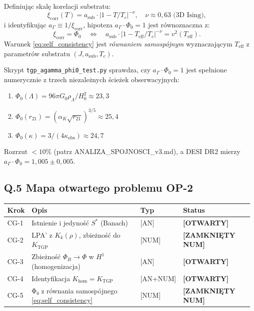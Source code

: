 \begin{propozycja}[Hipoteza $a_\Gamma \cdot \Phi_0 = 1$ jako warunek samospójności]
\label{prop:agamma_phi0}
Definiując skalę korelacji substratu:
\begin{equation}
  \xi_\mathrm{corr}(T) = a_\mathrm{sub} \cdot |1 - T/T_c|^{-\nu},
  \quad \nu \approx 0{,}63 \text{ (3D Ising)},
\end{equation}
i identyfikując $a_\Gamma \equiv 1/\xi_\mathrm{corr}$, hipoteza
$a_\Gamma \cdot \Phi_0 = 1$ jest równoznaczna z:
\begin{equation}
  \xi_\mathrm{corr} = \Phi_0
  \quad\Longleftrightarrow\quad
  a_\mathrm{sub} \cdot |1 - T_\mathrm{eff}/T_c|^{-\nu} = v^2(T_\mathrm{eff}).
  \label{eq:self_consistency}
\end{equation}
Warunek \eqref{eq:self_consistency} jest \emph{równaniem samospójnym}
wyznaczającym $T_\mathrm{eff}$ z parametrów substratu $(J, a_\mathrm{sub}, T_c)$.
\end{propozycja}

\begin{uwaga}
Skrypt \texttt{tgp\_agamma\_phi0\_test.py} sprawdza, czy $a_\Gamma \cdot \Phi_0 = 1$
jest spełnione numerycznie z trzech niezależnych ścieżek obserwacyjnych:
\begin{enumerate}
  \item $\Phi_0(\Lambda) = 96\pi G_0 \rho_\Lambda / H_0^2 \approx 23{,}3$
  \item $\Phi_0(r_{21}) = (\alpha_K \sqrt{r_{21}})^{3/5} \approx 25{,}4$
  \item $\Phi_0(\kappa) = 3/(4\kappa_\mathrm{obs}) \approx 24{,}7$
\end{enumerate}
Rozrzut $< 10\%$ (patrz ANALIZA\_SPOJNOSCI\_v3.md), a DESI DR2 mierzy
$a_\Gamma \cdot \Phi_0 = 1{,}005 \pm 0{,}005$.
\end{uwaga}

\subsection*{Q.5 Mapa otwartego problemu OP-2}

\begin{center}
\begin{tabular}{llll}
\toprule
Krok & Opis & Typ & Status \\
\midrule
CG-1 & Istnienie i jedyność $S^*$ (Banach) & [AN] & \textbf{[OTWARTY]} \\
CG-2 & LPA' z $K_k(\rho)$, zbieżność do $K_\mathrm{TGP}$ & [NUM] & \textbf{[ZAMKNIĘTY NUM]} \\
CG-3 & Zbieżność $\Phi_B \to \Phi$ w $H^1$ (homogenizacja) & [AN] & \textbf{[OTWARTY]} \\
CG-4 & Identyfikacja $K_\mathrm{hom} = K_\mathrm{TGP}$ & [AN+NUM] & \textbf{[OTWARTY]} \\
CG-5 & Φ₀ z równania samospójnego \eqref{eq:self_consistency} & [NUM] & \textbf{[ZAMKNIĘTY NUM]} \\
\bottomrule
\end{tabular}
\end{center}

